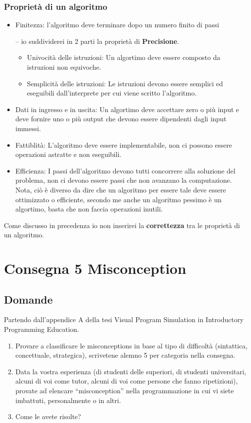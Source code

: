 \documentclass[a4paper]{article}
\begin{document}
\subsubsection{Proprietà di un algoritmo}
\begin{itemize}
	\item Finitezza: l'algoritmo deve terminare dopo un numero finito di passi
	\item[--]io suddividerei in 2 parti la proprietà di \textbf{Precisione}.
		\begin{itemize}
	\item Univocità delle istruzioni: Un algortimo deve essere composto da istruzioni non equivoche.
	\item Semplicità delle istruzioni: Le istruzioni devono essere semplici ed eseguibili dall'interprete per cui viene scritto l'algoritmo.
		\end{itemize}
	\item Dati in ingresso e in uscita: Un algortimo deve accettare zero o più input e deve fornire uno o più output che devono essere dipendenti dagli input immessi.
	\item Fattiblità: L'algoritmo deve essere implementabile, non ci possono essere operazioni astratte e non eseguibili.
	\item Efficienza: I passi dell'algoritmo devono tutti concorrere alla soluzione del problema, non ci devono essere passi che non avanzano la computazione.\\
		Nota, ciò è diverso da dire che un algoritmo per essere tale deve essere ottimizzato o efficiente, secondo me anche un algoritmo pessimo è un algortimo, basta che non faccia operazioni inutili.

\end{itemize}
Come discusso in precedenza io non inserirei la \textbf{correttezza} tra le proprietà di un algoritmo.
\section{Consegna 5 \large Misconception}

\subsection{Domande}
Partendo dall'appendice A della  tesi Visual Program Simulation in Introductory Programming Education.

\begin{enumerate}

	\item Provare a classificare le misconceptions in base al tipo di  difficoltà (sintattica, concettuale, strategica), scrivetene alemno 5 per categoria nella consegna.
	\item Data la vostra esperienza (di studenti delle superiori, di studenti universitari, alcuni di voi come tutor, alcuni di voi come persone che fanno ripetizioni), provate ad elencare “misconception” nella programmazione in cui vi siete imbattuti, personalmente o in altri.
	\item Come le avete risolte?
\end{enumerate}
\end{document}
